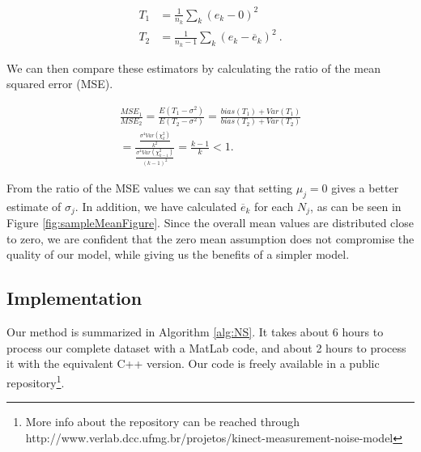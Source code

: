 {
\setlength\abovedisplayskip{-2pt} \setlength\belowdisplayskip{2pt} %
\begin{align}
T_1 &= \frac{1}{n_k}\sum_k(e_k-0)^2 \\
T_2 &= \frac{1}{n_k-1}\sum_k(e_k-\overline{e}_k)^2 \ .
\end{align}
}

\noindent We can then compare these estimators by calculating the ratio of the mean squared error (MSE).  

\begin{multline}
\frac{MSE_1}{MSE_2} = \frac{E(T_1-\sigma^2)}{E(T_2-\sigma^2)} = \frac{bias(T_1)+Var(T_1)}{bias(T_2)+Var(T_2)} \\ = \frac{ \frac{\sigma^4Var(\chi_k^2)}{k^2} } { \frac{\sigma^4Var(\chi_{k-1}^2)}{(k-1)^2} } = \frac{k-1}{k} < 1.
\end{multline}

\noindent From the ratio of the MSE values we can say that setting $\mu_j = 0$
gives a better estimate of $\sigma_j$. In addition, we have calculated
$\overline{e}_k$ for each $N_j$, as can be seen in Figure
\ref{fig:sampleMeanFigure}. Since the overall mean values are distributed close
to zero, we are confident that the zero mean assumption does not compromise the
quality of our model, while giving us the benefits of a simpler model. 

\subsection{Implementation} 

Our method is summarized in Algorithm \ref{alg:NS}. It takes about 6 hours to process our complete dataset with a MatLab code, and about 2 hours to process it with the equivalent C++ version. Our code is freely available in a public repository\footnote{More info about the repository can be reached through http://www.verlab.dcc.ufmg.br/projetos/kinect-measurement-noise-model}.

